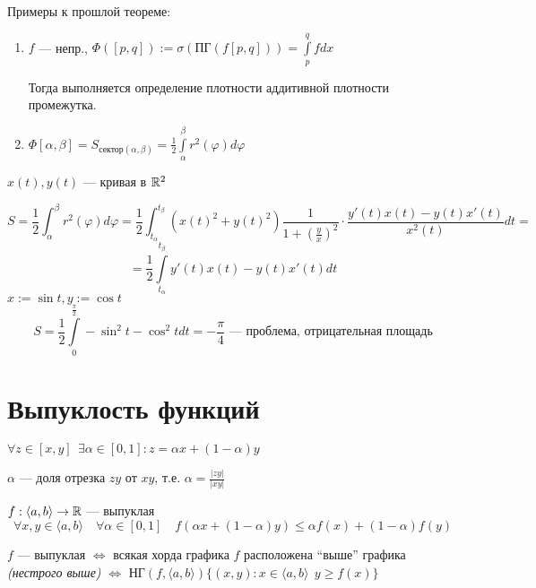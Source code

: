 



Примеры к прошлой теореме:
\begin{enumerate}
    \item $f$ --- непр., $\Phi ([p,q]) := \sigma (\text{ПГ}(f[p,q]))=\int\limits_p^q f dx$
    
    Тогда выполняется определение плотности аддитивной плотности промежутка.

    \item $\Phi [\alpha, \beta] = S_{\text{сектор}(\alpha,\beta)}=\frac{1}{2} \int\limits_{\alpha}^\beta r^2(\varphi)d\varphi$
\end{enumerate}

\begin{example}

$x(t), y(t)$ --- кривая в $\mathbb{R}^2$

$$S=\frac{1}{2}\int_\alpha^\beta r^2(\varphi) d\varphi = \frac{1}{2}\int_{t_\alpha}^{t_\beta}(x(t)^2+y(t)^2)\frac{1}{1+\left(\frac{y}{x}\right)^2}\cdot\frac{y'(t)x(t)-y(t)x'(t)}{x^2(t)}dt=$$
$$=\frac{1}{2}\int\limits_{t_\alpha}^{t_\beta}y'(t)x(t)-y(t)x'(t)dt$$
$x:=\sin t, y:=\cos t$
$$S=\frac{1}{2}\int\limits_{0}^{\frac{\pi}{2}}-\sin^2 t -\cos^2 t  dt = -\frac{\pi}{4} \text{ --- проблема, отрицательная площадь}$$

\end{example}

\section{Выпуклость функций}

$\forall z\in[x,y] \ \ \exists \alpha\in[0,1]: z = \alpha x + (1-\alpha) y$

$\alpha$ --- доля отрезка $zy$ от $xy$, т.е. $\alpha=\frac{|zy|}{|xy|}$

\begin{definition}
    $f:\langle a,b\rangle\to\mathbb{R}$ --- выпуклая
    $$\forall x,y\in\langle a,b\rangle \quad \forall \alpha\in[0,1] \quad f(\alpha x + (1-\alpha)y)\leq \alpha f(x) + (1-\alpha)f(y)$$
\end{definition}

\begin{remark}
    $f$ --- выпуклая $\Leftrightarrow$ всякая хорда графика $f$ расположена ``выше'' графика \textit{(нестрого выше)} $\Leftrightarrow$ $\text{НГ}(f, \langle a,b\rangle)\{(x,y) : x\in\langle a,b\rangle \ \ y\geq f(x)\}$
\end{remark}

